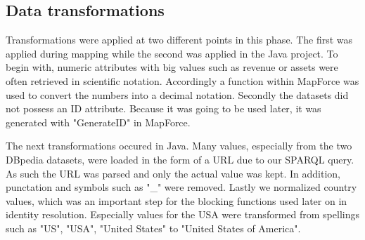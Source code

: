 \subsection{Data transformations}
Transformations were applied at two different points in this phase. The first was applied during mapping while the second was applied in the Java project. To begin with, numeric attributes with big values such as revenue or assets were often retrieved in scientific notation. Accordingly a function within MapForce was used to convert the numbers into a decimal notation. Secondly the datasets did not possess an ID attribute. Because it was going to be used later, it was generated with "GenerateID" in MapForce. 

The next transformations occured in Java. Many values, especially from the two DBpedia datasets, were loaded in the form of a URL due to our SPARQL query. As such the URL was parsed and only the actual value was kept. In addition, punctation and symbols such as "\_" were removed. Lastly we normalized country values, which was an important step for the blocking functions used later on in identity resolution. Especially values for the USA were transformed from spellings such as "US", "USA", "United States" to "United States of America".










